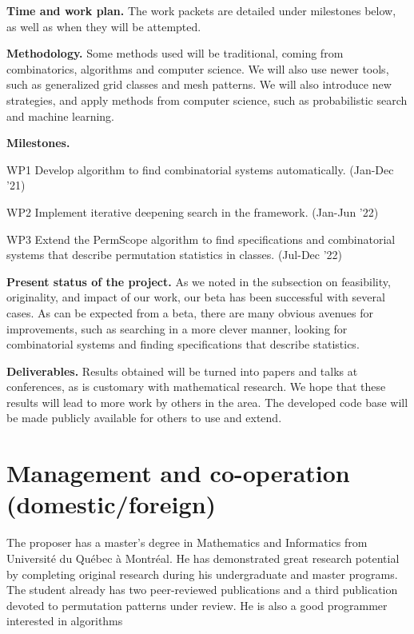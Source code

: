 \documentclass{rannis}
\newcommand{\tilealg}{\textsf{PermScope}}
\newcommand{\yearofappls}{21}
\newcommand{\yearofapplsp}{22}
\theoremstyle{definition}
\newenvironment{packed_enum}{
\begin{enumerate}
  \setlength{\itemsep}{-1pt}
  \setlength{\parskip}{-1pt}
  \setlength{\parsep}{-1pt}
}{\end{enumerate}}
\begin{document}
\noindent \textbf{Time and work plan.}
The work packets are detailed under milestones below, as well as when they will
be attempted.

\noindent\textbf{Methodology.}
Some methods used will be traditional, coming from combinatorics, algorithms and
computer science. We will also use newer tools, such as generalized grid classes
and mesh patterns. We will also introduce new strategies, and
apply methods from computer science, such as probabilistic search and machine
learning.

\noindent \textbf{Milestones.}
\begin{packed_enum}

\item[WP1] Develop algorithm to find combinatorial systems automatically.
    (Jan-Dec '\yearofappls)
\item[WP2] Implement iterative deepening search in the framework. (Jan-Jun '\yearofapplsp)
\item[WP3] Extend the \tilealg{} algorithm to find specifications and
    combinatorial systems that describe permutation statistics in classes.
    (Jul-Dec '\yearofapplsp)

\end{packed_enum}

\noindent\textbf{Present status of the project.} As we noted in the subsection on
feasibility, originality, and impact of our work, our beta has been successful
with several cases. As can be expected from a beta, there are many
obvious avenues for improvements, such as
searching in a more clever manner, looking for combinatorial systems and
finding specifications that describe statistics.

\noindent\textbf{Deliverables.}
Results obtained will be turned into papers and talks at conferences, as is
customary with mathematical research.  We hope that these results will lead to
more work by others in the area. The developed code base will be made publicly
available for others to use and extend.
\\

\section{Management and co-operation (domestic/foreign)}
The proposer has a master's degree in Mathematics and Informatics from
Universit\'e du Qu\'ebec \`a Montr\'eal. He has demonstrated great research
potential by completing original research during his undergraduate and master
programs. The student already has two peer-reviewed publications and a third publication
devoted to permutation patterns under review.
He is also a
good programmer interested in algorithms
\end{document}
